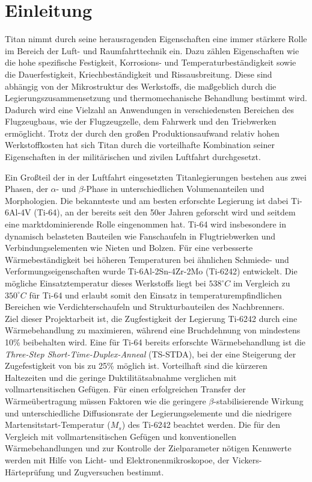\chapter{Einleitung} 
Titan nimmt durch seine herausragenden Eigenschaften eine immer stärkere Rolle im Bereich der Luft- und Raumfahrttechnik ein. Dazu zählen Eigenschaften wie die hohe spezifische Festigkeit, Korrosions- und Temperaturbeständigkeit sowie die Dauerfestigkeit, Kriechbeständigkeit und Rissausbreitung. Diese sind abhängig von der Mikrostruktur des Werkstoffs, die maßgeblich durch die Legierungszusammensetzung und thermomechanische Behandlung bestimmt wird. Dadurch wird eine Vielzahl an Anwendungen in verschiedensten Bereichen des Flugzeugbaus, wie der Flugzeugzelle, dem Fahrwerk und den Triebwerken ermöglicht. Trotz der durch den großen Produktionsaufwand relativ hohen Werkstoffkosten hat sich Titan durch die vorteilhafte Kombination seiner Eigenschaften in der militärischen und zivilen Luftfahrt durchgesetzt. 

Ein Großteil der in der Luftfahrt eingesetzten Titanlegierungen bestehen aus zwei Phasen, der $\alpha$- und $\beta$-Phase in unterschiedlichen Volumenanteilen und Morphologien. Die bekannteste und am besten erforschte Legierung ist dabei Ti-6Al-4V (Ti-64), an der bereits seit den 50er Jahren geforscht wird und seitdem eine marktdominierende Rolle eingenommen hat. Ti-64 wird insbesondere in dynamisch belasteten Bauteilen wie Fanschaufeln in Flugtriebwerken und Verbindungselementen wie Nieten und Bolzen. 
Für eine verbesserte Wärmebeständigkeit bei höheren Temperaturen bei ähnlichen Schmiede- und Verformungseigenschaften wurde Ti-6Al-2Sn-4Zr-2Mo (Ti-6242) entwickelt. Die mögliche Einsatztemperatur dieses Werkstoffs liegt bei $538^\circ C$ im Vergleich zu $350^\circ C$ für Ti-64 und erlaubt somit den Einsatz in temperaturempfindlichen Bereichen wie Verdichterschaufeln und Strukturbauteilen des Nachbrenners. \\
Ziel dieser Projektarbeit ist, die Zugfestigkeit der Legierung Ti-6242 durch eine Wärmebehandlung zu maximieren, während eine Bruchdehnung von mindestens 10\% beibehalten wird. Eine für Ti-64 bereits erforschte Wärmebehandlung ist die \textit{Three-Step Short-Time-Duplex-Anneal} (TS-STDA), bei der eine Steigerung der Zugefestigkeit von bis zu 25\% möglich ist. Vorteilhaft sind die kürzeren Haltezeiten und die geringe Duktilitätsabnahme verglichen mit vollmartensitischen Gefügen. Für einen erfolgreichen Transfer der Wärmeübertragung müssen Faktoren wie die geringere $\beta$-stabilisierende Wirkung und unterschiedliche Diffusionsrate der Legierungselemente und die niedrigere Martensitstart-Temperatur ($M_s$) des Ti-6242 beachtet werden. Die für den Vergleich mit vollmartensitischen Gefügen und konventionellen Wärmebehandlungen und zur Kontrolle der Zielparameter nötigen Kennwerte werden mit Hilfe von Licht- und Elektronenmikroskopoe, der Vickers-Härteprüfung und Zugversuchen bestimmt. 

